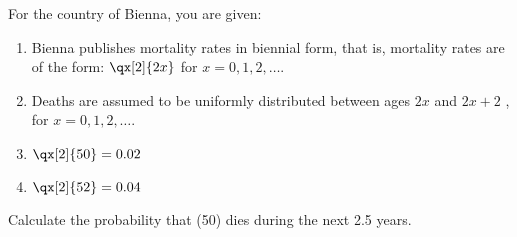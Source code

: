 For the country of Bienna, you are given:
\begin{enumerate}
\item Bienna publishes mortality rates in biennial form, that is, mortality rates are of the form: \( \qx[2]{2x}\) for $x=0,1,2,\ldots$. 
\item Deaths are assumed to be uniformly distributed between ages $2x$ and $2x+2$ , for $x=0,1,2,\ldots$. 
\item $\qx[2]{50} = 0.02$
\item $\qx[2]{52} = 0.04$
\end{enumerate}
Calculate the probability that (50) dies during the next 2.5 years.

